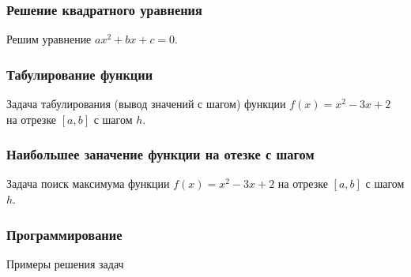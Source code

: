 \begin{frame}[fragile]
\frametitle{Решение квадратного уравнения}

Решим уравнение $ax^2+bx+c=0$.


    
\end{frame}

\begin{frame}[fragile]
\frametitle{Табулирование функции}

Задача табулирования (вывод значений с шагом) функции $f(x)=x^2-3x+2$ на отрезке $[a,b]$ с шагом $h$.


    
\end{frame}

\begin{frame}[fragile]
\frametitle{Наибольшее заначение функции на отезке с шагом}

Задача поиск максимума функции $f(x)=x^2-3x+2$ на отрезке $[a,b]$ с шагом $h$.

    
\end{frame}

\begin{frame}
\frametitle{Программирование}

\begin{center}

\Huge
Примеры решения задач
\end{center}
\end{frame}
